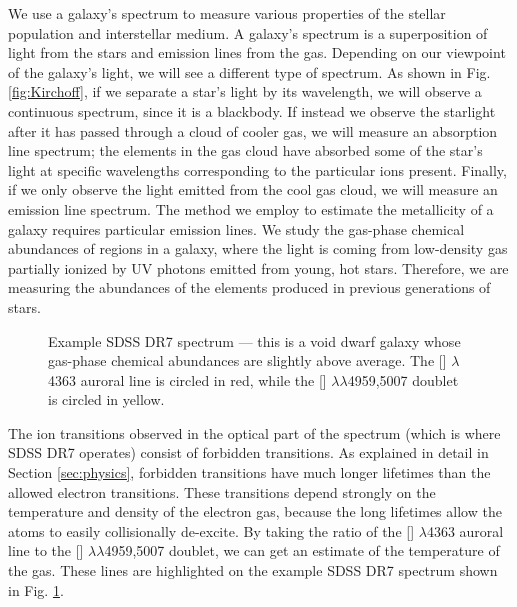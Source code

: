 We use a galaxy's spectrum to measure various properties of the stellar 
population and interstellar medium.  A galaxy's spectrum is a superposition of 
light from the stars and emission lines from the gas.  Depending on our 
viewpoint of the galaxy's light, we will see a different type of spectrum.  As 
shown in Fig. \ref{fig:Kirchoff}, if we separate a star's light by its 
wavelength, we will observe a continuous spectrum, since it is a blackbody.  If 
instead we observe the starlight after it has passed through a cloud of cooler 
gas, we will measure an absorption line spectrum; the elements in the gas cloud 
have absorbed some of the star's light at specific wavelengths corresponding to 
the particular ions present.  Finally, if we only observe the light emitted from 
the cool gas cloud, we will measure an emission line spectrum.  The method we 
employ to estimate the metallicity of a galaxy requires particular emission 
lines.  We study the gas-phase chemical abundances of  regions in a 
galaxy, where the light is coming from low-density gas partially ionized by UV 
photons emitted from young, hot stars.  Therefore, we are measuring the 
abundances of the elements produced in previous generations of stars.

\begin{figure}
    \caption[Sample (void) dwarf galaxy spectrum]{Example SDSS DR7 spectrum --- 
    this is a void dwarf galaxy whose gas-phase chemical abundances are slightly 
    above average.  The [] $\lambda$4363 auroral line is circled in 
    red, while the [] $\lambda \lambda$4959,5007 doublet is circled in 
    yellow.}
    \label{fig:spectrum}
\end{figure}

The ion transitions observed in the optical part of the spectrum (which is where 
SDSS DR7 operates) consist of forbidden transitions.  As explained in detail in 
Section \ref{sec:physics}, forbidden transitions have much longer lifetimes than 
the allowed electron transitions.  These transitions depend strongly on the 
temperature and density of the electron gas, because the long lifetimes allow 
the atoms to easily collisionally de-excite.  By taking the ratio of the 
[] $\lambda$4363 auroral line to the [] 
$\lambda \lambda$4959,5007 doublet, we can get an estimate of the temperature of 
the gas.  These lines are highlighted on the example SDSS DR7 spectrum shown in 
Fig. \ref{fig:spectrum}.  

